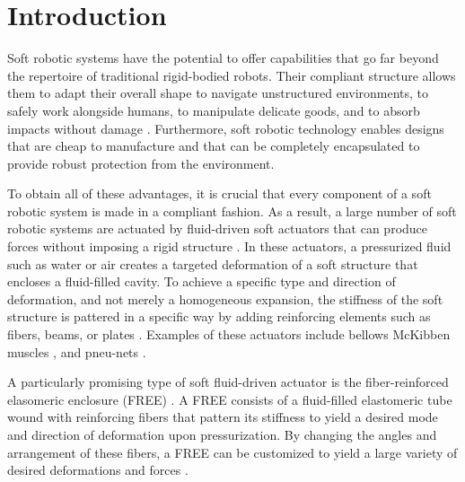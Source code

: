 \section{Introduction}
\label{sec:introduction}

Soft robotic systems have the potential to offer capabilities that go far beyond the repertoire of traditional rigid-bodied robots.
Their compliant structure allows them to adapt their overall shape to navigate unstructured environments, to safely work alongside humans, to manipulate delicate goods, and to absorb impacts without damage \cite{majidi2014soft}. 
Furthermore, soft robotic technology enables designs that are cheap to manufacture and that can be completely encapsulated to provide robust protection from the environment.


To obtain all of these advantages, it is crucial that every component of a soft robotic system is made in a compliant fashion.
As a result, a large number of soft robotic systems are actuated by fluid-driven soft actuators that can produce forces without imposing a rigid structure \cite{grissom2006design, hawkes2017soft, marchese2014autonomous, tolley2014resilient}. 
In these actuators, a pressurized fluid such as water or air creates a targeted deformation of a soft structure that encloses a fluid-filled cavity. 
To achieve a specific type and direction of deformation, and not merely a homogeneous expansion, the stiffness of the soft structure is pattered in a specific way by adding reinforcing elements such as fibers, beams, or plates \cite{galloway2013mechanically, marchese2015recipe, rus2015design}. 
Examples of these actuators include bellows \cite{pridham1967bellows} McKibben muscles \cite{tondu2012modelling}, and pneu-nets \cite{mosadegh2014pneumatic}.


A particularly promising type of soft fluid-driven actuator is the fiber-reinforced elasomeric enclosure (FREE) \cite{bishop2015design}. 
A FREE consists of a fluid-filled elastomeric tube wound with reinforcing fibers that pattern its stiffness to yield a desired mode and direction of deformation upon pressurization. %
By changing the angles and arrangement of these fibers, a FREE can be customized to yield a large variety of desired deformations and forces \cite{bishop2015design}. 



